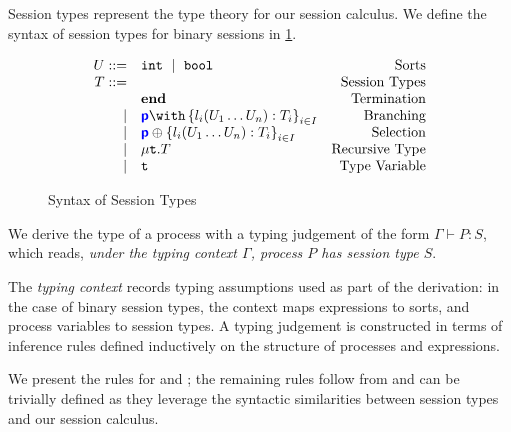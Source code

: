 {Session types} represent the type theory for our session calculus.
We define the syntax of session types for binary sessions in
\cref{fig:bst}. 

\begin{figure}[!hb]
\doublespacing
\[
\begin{array}{rlr}

U ::= & \text{\tt{int}}~\mid~\text{\tt{bool}} & \text{Sorts} \\

T ::= & & \text{Session Types} \\
     & \mathbf{end} & \text{Termination} \\
\mid & \tbra{\role{p}}{l_i(U_1 \dots U_n):T_i}{i\in I} & \text{Branching} \\
\mid & \tsel{\role{p}}{l_i(U_1 \dots U_n):T_i}{i\in I} & \text{Selection} \\
\mid & \trec{T} & \text{Recursive Type} \\
\mid & \trecvar & \text{Type Variable} \\
\end{array}
\]

\singlespacing
\caption{Syntax of Session Types}
\label{fig:bst}
\end{figure}

We derive the type of a process with a {typing judgement} 
of the form $\Gamma \vdash P: S$, which reads, 
\textit{under the typing context $\Gamma$, 
process $P$ has session type $S$}. 

The \textit{typing context} records typing assumptions 
used as part of the derivation: in the case of binary session types, 
the context maps expressions to sorts, 
and process variables to session types. 
A typing judgement is constructed in terms of inference rules 
defined inductively on the structure of 
processes and expressions.

We present the rules for  and ; 
the remaining rules follow from \cite{C406Lecture} 
and can be trivially defined as 
they leverage the syntactic similarities between 
session types and our session calculus.

\begin{prooftree}
\end{prooftree}

\begin{prooftree}
\end{prooftree}

